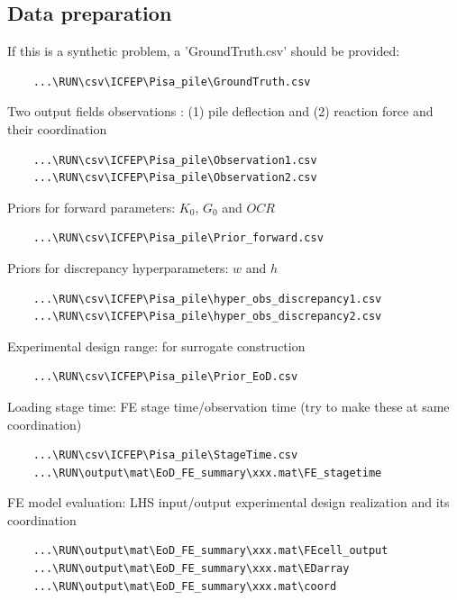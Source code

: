 \documentclass{ol-softwaremanual}
\begin{document}
\subsection*{Data preparation}
If this is a synthetic problem, a 'GroundTruth.csv' should be provided:
\begin{verbatim}
    ...\RUN\csv\ICFEP\Pisa_pile\GroundTruth.csv
\end{verbatim}
Two output fields observations : (1) pile deflection and (2) reaction force and their coordination
\begin{verbatim}
    ...\RUN\csv\ICFEP\Pisa_pile\Observation1.csv
    ...\RUN\csv\ICFEP\Pisa_pile\Observation2.csv
\end{verbatim}
Priors for forward parameters: $K_0$, $G_0$ and $OCR$
\begin{verbatim}
    ...\RUN\csv\ICFEP\Pisa_pile\Prior_forward.csv
\end{verbatim}
Priors for discrepancy hyperparameters: $w$ and $h$
\begin{verbatim}
    ...\RUN\csv\ICFEP\Pisa_pile\hyper_obs_discrepancy1.csv
    ...\RUN\csv\ICFEP\Pisa_pile\hyper_obs_discrepancy2.csv
\end{verbatim}
Experimental design range: for surrogate construction
\begin{verbatim}
    ...\RUN\csv\ICFEP\Pisa_pile\Prior_EoD.csv
\end{verbatim}
Loading stage time: FE stage time/observation time (try to make these at same coordination)
\begin{verbatim}
    ...\RUN\csv\ICFEP\Pisa_pile\StageTime.csv
    ...\RUN\output\mat\EoD_FE_summary\xxx.mat\FE_stagetime
\end{verbatim}
FE model evaluation: LHS input/output experimental design realization and its coordination
\begin{verbatim}
    ...\RUN\output\mat\EoD_FE_summary\xxx.mat\FEcell_output
    ...\RUN\output\mat\EoD_FE_summary\xxx.mat\EDarray
    ...\RUN\output\mat\EoD_FE_summary\xxx.mat\coord 
\end{verbatim}
\end{document}
